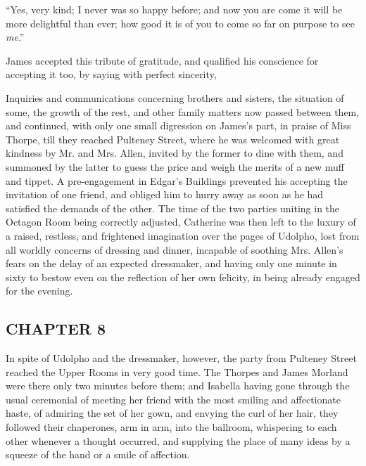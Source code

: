 
“Yes, very kind; I never was so happy before; and now you are come it will be more delightful than ever; how good it is of you to come so far on purpose to see {\em me}.”

James accepted this tribute of gratitude, and qualified his conscience for accepting it too, by saying with perfect sincerity, 

Inquiries and communications concerning brothers and sisters, the situation of some, the growth of the rest, and other family matters now passed between them, and continued, with only one small digression on James's part, in praise of Miss Thorpe, till they reached Pulteney Street, where he was welcomed with great kindness by Mr. and Mrs. Allen, invited by the former to dine with them, and summoned by the latter to guess the price and weigh the merits of a new muff and tippet. A pre-engagement in Edgar's Buildings prevented his accepting the invitation of one friend, and obliged him to hurry away as soon as he had satisfied the demands of the other. The time of the two parties uniting in the Octagon Room being correctly adjusted, Catherine was then left to the luxury of a raised, restless, and frightened imagination over the pages of Udolpho, lost from all worldly concerns of dressing and dinner, incapable of soothing Mrs. Allen's fears on the delay of an expected dressmaker, and having only one minute in sixty to bestow even on the reflection of her own felicity, in being already engaged for the evening.

\subsection[chapter-8]{\useURL[url10][][][]\from[url10]CHAPTER 8}

In spite of Udolpho and the dressmaker, however, the party from Pulteney Street reached the Upper Rooms in very good time. The Thorpes and James Morland were there only two minutes before them; and Isabella having gone through the usual ceremonial of meeting her friend with the most smiling and affectionate haste, of admiring the set of her gown, and envying the curl of her hair, they followed their chaperones, arm in arm, into the ballroom, whispering to each other whenever a thought occurred, and supplying the place of many ideas by a squeeze of the hand or a smile of affection.

